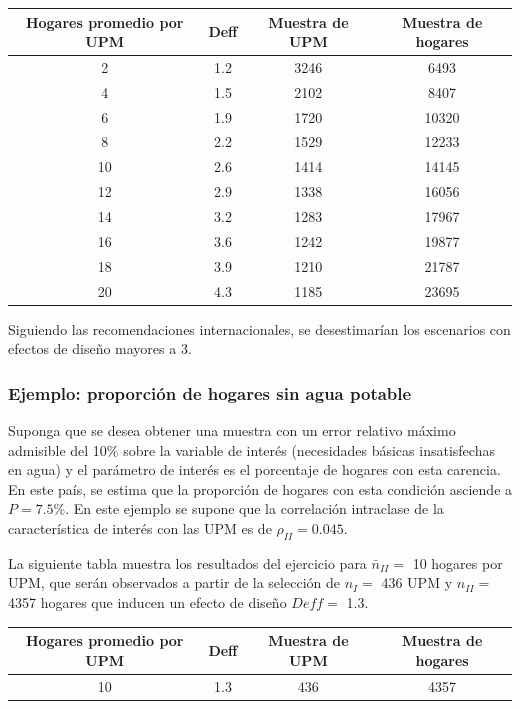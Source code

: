 \documentclass[
  10pt,
  spanish,
]{book}
\begin{document}
\begin{longtable}[]{@{}cccc@{}}
\toprule
Hogares promedio por UPM & Deff & Muestra de UPM & Muestra de hogares \\
\midrule
\endhead
2 & 1.2 & 3246 & 6493 \\
4 & 1.5 & 2102 & 8407 \\
6 & 1.9 & 1720 & 10320 \\
8 & 2.2 & 1529 & 12233 \\
10 & 2.6 & 1414 & 14145 \\
12 & 2.9 & 1338 & 16056 \\
14 & 3.2 & 1283 & 17967 \\
16 & 3.6 & 1242 & 19877 \\
18 & 3.9 & 1210 & 21787 \\
20 & 4.3 & 1185 & 23695 \\
\bottomrule
\end{longtable}

Siguiendo las recomendaciones internacionales, se desestimarían los escenarios con efectos de diseño mayores a 3.

\hypertarget{ejemplo-proporciuxf3n-de-hogares-sin-agua-potable}{%
\subsubsection{Ejemplo: proporción de hogares sin agua potable}\label{ejemplo-proporciuxf3n-de-hogares-sin-agua-potable}}

Suponga que se desea obtener una muestra con un error relativo máximo admisible del 10\% sobre la variable de interés (necesidades básicas insatisfechas en agua) y el parámetro de interés es el porcentaje de hogares con esta carencia. En este país, se estima que la proporción de hogares con esta condición asciende a \(P = 7.5\)\%. En este ejemplo se supone que la correlación intraclase de la característica de interés con las UPM es de \(\rho_{II} = 0.045\).

La siguiente tabla muestra los resultados del ejercicio para \(\bar{n}_{II} =\) 10 hogares por UPM, que serán observados a partir de la selección de \(n_{I} =\) 436 UPM y \(n_{II} =\) 4357 hogares que inducen un efecto de diseño \(Deff =\) 1.3.

\begin{longtable}[]{@{}cccc@{}}
\toprule
Hogares promedio por UPM & Deff & Muestra de UPM & Muestra de hogares \\
\midrule
\endhead
10 & 1.3 & 436 & 4357 \\
\bottomrule
\end{longtable}
\end{document}
